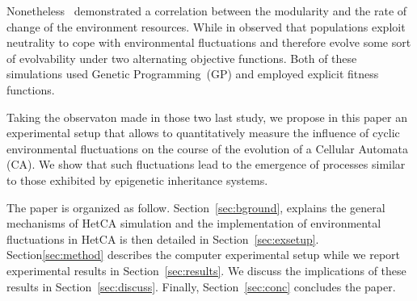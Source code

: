 Nonetheless~\cite{lipson2002origin} demonstrated a correlation between the modularity and the rate of change of the environment resources. While in \cite{yu2007program} observed that populations exploit neutrality to cope with environmental fluctuations and therefore evolve some sort of evolvability under two alternating objective functions. Both of these simulations used Genetic Programming~(GP) and employed explicit fitness functions.

Taking the observaton made in those two last study, we propose in this paper an experimental setup that allows to quantitatively measure the influence of cyclic environmental fluctuations on the course of the evolution of a Cellular Automata (CA). We show that such fluctuations lead to the emergence of processes similar to those exhibited by epigenetic inheritance systems. 

The paper is organized as follow. Section~\ref{sec:bground}, explains the general mechanisms of HetCA simulation and the implementation of environmental fluctuations in HetCA is then detailed in Section~\ref{sec:exsetup}. Section\ref{sec:method} describes the computer experimental setup while we report experimental results in Section~\ref{sec:results}. We discuss the implications of these results in Section~\ref{sec:discuss}. Finally, Section~\ref{sec:conc} concludes the paper.

